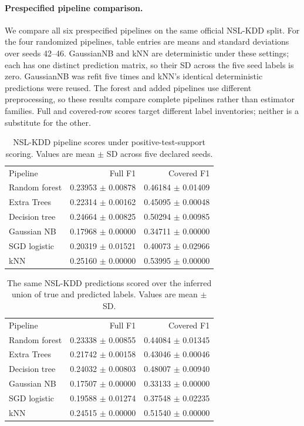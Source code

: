 \documentclass[namedate,webpdf,contemporary,large]{TBench-template}
\begin{document}
\paragraph{Prespecified pipeline comparison.}
We compare all six prespecified pipelines on the same official NSL-KDD split. For the four randomized pipelines, table entries are means and standard deviations over seeds 42--46. GaussianNB and kNN are deterministic under these settings; each has one distinct prediction matrix, so their SD across the five seed labels is zero. GaussianNB was refit five times and kNN's identical deterministic predictions were reused. The forest and added pipelines use different preprocessing, so these results compare complete pipelines rather than estimator families. Full and covered-row scores target different label inventories; neither is a substitute for the other.
\begin{table}[h]\centering
\caption{NSL-KDD pipeline scores under positive-test-support scoring. Values are mean $\pm$ SD across five declared seeds.}
\begin{tabular}{lrr}
Pipeline & Full F1 & Covered F1\\
Random forest & 0.23953 $\pm$ 0.00878 & 0.46184 $\pm$ 0.01409\\
Extra Trees & 0.22314 $\pm$ 0.00162 & 0.45095 $\pm$ 0.00048\\
Decision tree & 0.24664 $\pm$ 0.00825 & 0.50294 $\pm$ 0.00985\\
Gaussian NB & 0.17968 $\pm$ 0.00000 & 0.34711 $\pm$ 0.00000\\
SGD logistic & 0.20319 $\pm$ 0.01521 & 0.40073 $\pm$ 0.02966\\
kNN & 0.25160 $\pm$ 0.00000 & 0.53995 $\pm$ 0.00000\\
\end{tabular}\end{table}
\begin{table}[h]\centering
\caption{The same NSL-KDD predictions scored over the inferred union of true and predicted labels. Values are mean $\pm$ SD.}
\begin{tabular}{lrr}
Pipeline & Full F1 & Covered F1\\
Random forest & 0.23338 $\pm$ 0.00855 & 0.44084 $\pm$ 0.01345\\
Extra Trees & 0.21742 $\pm$ 0.00158 & 0.43046 $\pm$ 0.00046\\
Decision tree & 0.24032 $\pm$ 0.00803 & 0.48007 $\pm$ 0.00940\\
Gaussian NB & 0.17507 $\pm$ 0.00000 & 0.33133 $\pm$ 0.00000\\
SGD logistic & 0.19588 $\pm$ 0.01274 & 0.37548 $\pm$ 0.02235\\
kNN & 0.24515 $\pm$ 0.00000 & 0.51540 $\pm$ 0.00000\\
\end{tabular}\end{table}
\end{document}
